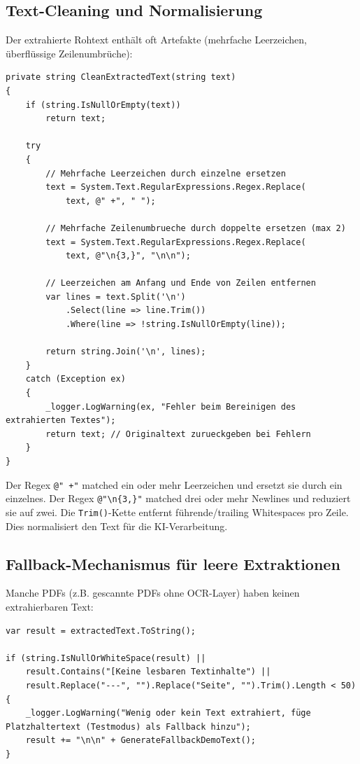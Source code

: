 \subsection{Text-Cleaning und Normalisierung}
Der extrahierte Rohtext enthält oft Artefakte (mehrfache Leerzeichen, überflüssige Zeilenumbrüche):

\begin{lstlisting}[language={[Sharp]C}, caption={Text-Bereinigung mit Regex}, label={lst:text_cleaning}]
private string CleanExtractedText(string text)
{
    if (string.IsNullOrEmpty(text))
        return text;

    try
    {
        // Mehrfache Leerzeichen durch einzelne ersetzen
        text = System.Text.RegularExpressions.Regex.Replace(
            text, @" +", " ");
        
        // Mehrfache Zeilenumbrueche durch doppelte ersetzen (max 2)
        text = System.Text.RegularExpressions.Regex.Replace(
            text, @"\n{3,}", "\n\n");
        
        // Leerzeichen am Anfang und Ende von Zeilen entfernen
        var lines = text.Split('\n')
            .Select(line => line.Trim())
            .Where(line => !string.IsNullOrEmpty(line));
        
        return string.Join('\n', lines);
    }
    catch (Exception ex)
    {
        _logger.LogWarning(ex, "Fehler beim Bereinigen des extrahierten Textes");
        return text; // Originaltext zurueckgeben bei Fehlern
    }
}
\end{lstlisting}

Der Regex \texttt{@" +"} matched ein oder mehr Leerzeichen und ersetzt sie durch ein einzelnes. Der Regex \texttt{@"\textbackslash n\{3,\}"} matched drei oder mehr Newlines und reduziert sie auf zwei. Die \texttt{Trim()}-Kette entfernt führende/trailing Whitespaces pro Zeile. Dies normalisiert den Text für die KI-Verarbeitung.

\subsection{Fallback-Mechanismus für leere Extraktionen}
Manche PDFs (z.B. gescannte PDFs ohne OCR-Layer) haben keinen extrahierbaren Text:

\begin{lstlisting}[language={[Sharp]C}, caption={Empty-Text-Detection}, label={lst:fallback_check}]
var result = extractedText.ToString();

if (string.IsNullOrWhiteSpace(result) || 
    result.Contains("[Keine lesbaren Textinhalte") ||
    result.Replace("---", "").Replace("Seite", "").Trim().Length < 50)
{
    _logger.LogWarning("Wenig oder kein Text extrahiert, füge Platzhaltertext (Testmodus) als Fallback hinzu");
    result += "\n\n" + GenerateFallbackDemoText();
}
\end{lstlisting}

